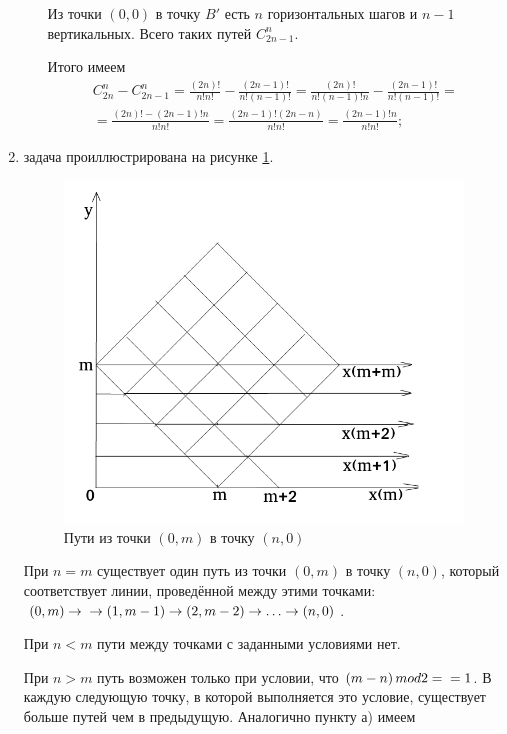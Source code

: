 \begin{enumerate}[label=\alph*)]
\begin{enumerate}[label=(\roman*)]
Из точки $ \left( 0, 0 \right) $ в точку $B'$ есть $n$ горизонтальных шагов и $n - 1$ вертикальных.
Всего таких путей $C_{2n-1}^n$.

Итого имеем
\begin{equation*}
\begin{split}
C_{2n}^n - C_{2n-1}^n =
\frac{ \left( 2n \right)!}{n! n!} - \frac{ \left( 2n-1 \right)!}{n! \left( n-1 \right)!} =
\frac{ \left( 2n \right)!}{n! \left( n-1 \right)! n} - \frac{ \left( 2n-1 \right)!}{n! \left( n-1 \right)!} = \\
= \frac{ \left( 2n \right)! - \left( 2n-1 \right)! n}{n! n!} =
\frac{ \left( 2n-1 \right)! \left( 2n-n \right)}{n! n!} =
\frac{ \left( 2n-1 \right)! n}{n! n!};
\end{split}
\end{equation*}
\end{enumerate}

\item задача проиллюстрирована на рисунке \ref{fig:4222}.

\begin{figure}[h!]
  \centering
  \includegraphics[width=.6\textwidth]{./pictures/4_22_2.png}
  \caption{Пути из точки $ \left( 0, m \right) $ в точку $ \left( n, 0 \right) $}
  \label{fig:4222}
\end{figure}

При $n = m$
существует один путь из точки
$ \left( 0, m \right) $
в точку
$ \left( n, 0 \right)$,
который соответствует линии,
проведённой между этими точками:
$ \left( 0, m \right) \rightarrow \\
\rightarrow \left( 1, m-1 \right) \rightarrow
\left( 2, m-2 \right) \rightarrow \dotsc \rightarrow \left( n, 0 \right)$.

При $n < m$ пути между точками с заданными условиями нет.

При $n > m$ путь возможен только при условии, что $ \left( m-n \right) mod 2 = \\ = 1$.
В каждую следующую точку, в которой выполняется это условие, существует больше путей чем в предыдущую.
Аналогично пункту а) имеем


\end{enumerate}
